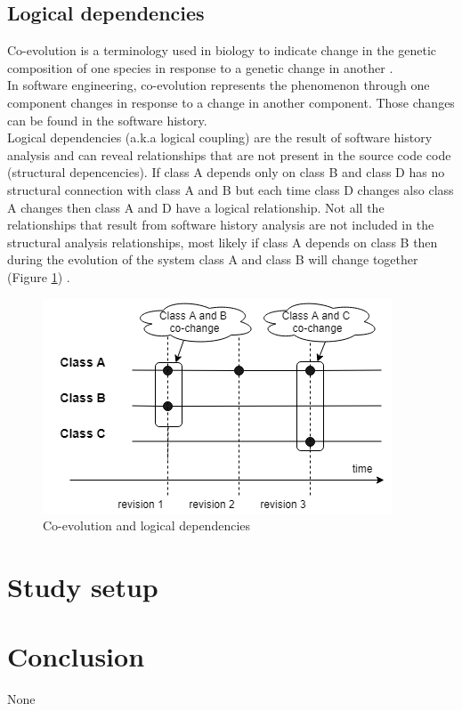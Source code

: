 \documentclass[conference,compsoc]{IEEEtran}
\begin{document}
\subsection{ Logical dependencies}
Co-evolution is a terminology used in biology to indicate change in the genetic composition of one species in response to a genetic change in another \cite{ct5}. \\In software engineering, co-evolution represents the phenomenon through one component changes in response to a change in another component. Those changes can be found in the software history. \cite{ct6}\\  Logical dependencies (a.k.a logical coupling) are the result of software history analysis and can reveal relationships that are not present in the source code code (structural depencencies). If class A depends only on class B  and class D has no structural connection with class A and B but each time class D changes also class A changes then class A and D have a logical relationship. Not all the relationships that result from software history analysis are not included in the structural analysis relationships, most likely if class A depends on class B then during the evolution of the system class A and class B will change together  (Figure \ref{fig:fig3}) .

\begin{figure}
\includegraphics[scale=0.65]{fig3.png}
\caption{Co-evolution and logical dependencies}
\label{fig:fig3}
\end{figure}

\section{Study setup}

\section{Conclusion}
None 
\end{document}
